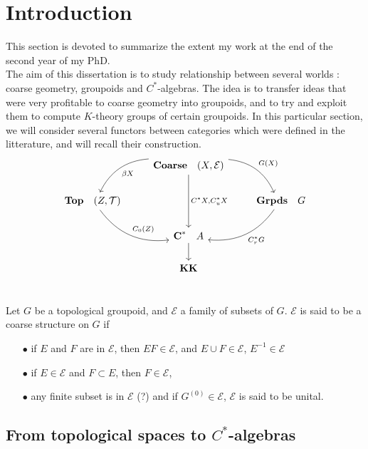 \section{Introduction}

This section is devoted to summarize the extent my work at the end of the second year of my PhD.\\

The aim of this dissertation is to study relationship between several worlds : coarse geometry, groupoids and $C^*$-algebras. The idea is to transfer ideas that were very profitable to coarse geometry into groupoids, and to try and exploit them to compute $K$-theory groups of certain groupoids. In this particular section, we will consider several functors between categories which were defined in the litterature, and will recall their construction.\\

\[\begin{tikzcd}
\  & \textbf{Coarse} \quad (X,\mathcal E) \arrow[bend left]{dr}{G(X)} \arrow[bend right]{dl}{\beta X} \arrow{dd}{C^*X,C^*_uX}& \ \\
 \textbf{Top} \quad (Z,\mathcal T) \arrow[bend right]{dr}{C_0(Z)} & \  & \textbf{Grpds}\quad G \arrow[bend left]{dl}{C^*_r G} \\
 \ & \textbf{C}^* \quad A \arrow{d} & \ \\
\ & \textbf{KK} & \ \\
\end{tikzcd}\] 

\begin{definition}
Let $G$ be a topological groupoid, and $\mathcal E$ a family of subsets of $G$. $\mathcal E$ is said to be a coarse structure on $G$ if 
\begin{itemize}
\item[$\bullet$] if $E$ and $F$ are in $\mathcal E$, then $EF\in \mathcal E$, and $E\cup F\in \mathcal E$, $E^{-1}\in \mathcal E$
\item[$\bullet$] if $E\in \mathcal E$ and $F\subset E$, then $F\in \mathcal E$,
\item[$\bullet$] any finite subset is in $\mathcal E$ (?) and if $G^{(0)}\in \mathcal E$, $\mathcal E$ is said to be unital.
\end{itemize}
\end{definition}

\subsection{From topological spaces to $C^*$-algebras}

